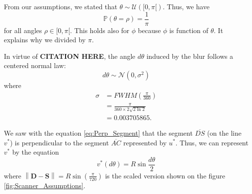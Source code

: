 \documentclass{article}
\begin{document}
From our assumptions, we stated that $\theta \sim \mathcal{U}([0, \pi[)$. Thus, we have 
\begin{equation*}
    \mathbb{P}(\theta = \rho) = \frac{1}{\pi}
\end{equation*}
for all angles $\rho \in [0, \pi[$. This holds also for $\phi$ because $\phi$ is function of $\theta$. It explains why we divided by $\pi$.


In virtue of \textbf{CITATION HERE}, the angle $d\theta$ induced by the blur follows a centered normal law: 
\begin{equation} \label{eq:dTheta_NormalLaw}
	d\theta \sim \mathcal{N}(0, \sigma^2)
\end{equation}
where 
\begin{align*}
    \sigma &= FWHM\left(\frac{\pi}{360}\right) \\
           &= \frac{\pi}{360 \times 2\sqrt{2 \ln 2}} \\
           &= 0.003705865.
\end{align*}

We saw with the equation \eqref{eq:Perp_Segment} that the segment $\overline{D S}$ (on the line $v^*$) is perpendicular to the segment $\overline{A C}$ represented by $u^*$. Thus, we can represent $v^*$ by the equation
\begin{equation} \label{eq:Perp_Sinus}
    v^*(d\theta) = R \sin{\frac{d\theta}{2}}
\end{equation}
where $\left\| \mathbf{D} - \mathbf{S} \right\| = R \sin{\left(\frac{\pi}{720}\right)}$ is the scaled version shown on the figure \ref{fig:Scanner_Assumptions}. 
\end{document}
